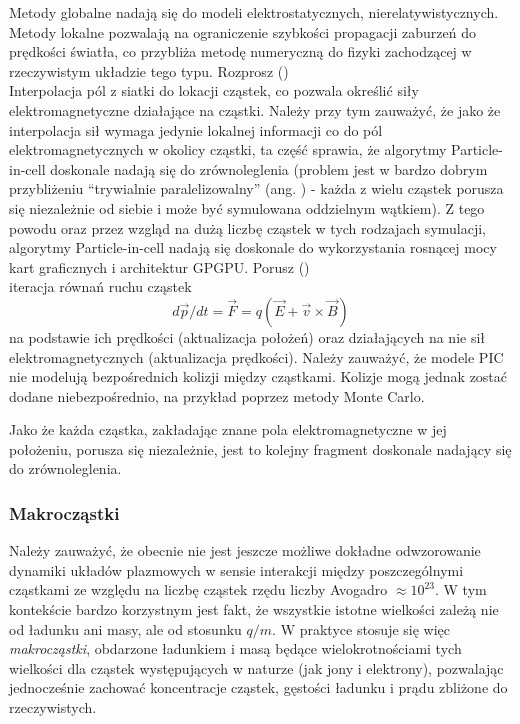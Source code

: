 \begin{itemize}
    Metody globalne nadają się do modeli elektrostatycznych,
    nierelatywistycznych.  Metody lokalne pozwalają na ograniczenie szybkości
    propagacji zaburzeń do prędkości światła, co przybliża metodę numeryczną do
    fizyki zachodzącej w rzeczywistym układzie tego typu.
    \itemi{} Rozprosz () \\
    Interpolacja pól z siatki do lokacji cząstek, co pozwala określić siły
    elektromagnetyczne działające na cząstki.  Należy przy tym zauważyć, że
    jako że interpolacja sił wymaga jedynie lokalnej informacji co do pól
    elektromagnetycznych w okolicy cząstki, ta część sprawia, że
    algorytmy Particle-in-cell doskonale nadają się do zrównoleglenia (problem
    jest w bardzo dobrym przybliżeniu ``trywialnie paralelizowalny'' (ang.
    ) - każda z
    wielu cząstek porusza się niezależnie od siebie i może być symulowana
    oddzielnym wątkiem). Z tego powodu oraz przez wzgląd na dużą liczbę cząstek
    w tych rodzajach symulacji, algorytmy Particle-in-cell nadają się doskonale
    do wykorzystania rosnącej mocy kart graficznych i architektur GPGPU\@.
    \itemi{} Porusz () \\
    iteracja równań ruchu cząstek
    \begin{equation}
        d \vec{p}/dt = \vec{F} = q (\vec{E} + \vec{v} \times \vec{B})
        \label{eq-of-motion}
    \end{equation}
    na podstawie ich prędkości (aktualizacja położeń) oraz działających na nie
    sił elektromagnetycznych (aktualizacja prędkości). Należy zauważyć, że
    modele PIC nie modelują bezpośrednich kolizji między cząstkami. Kolizje
    mogą jednak zostać dodane niebezpośrednio, na przykład poprzez metody Monte
    Carlo.

    Jako że każda cząstka, zakładając znane pola elektromagnetyczne w jej
    położeniu, porusza się niezależnie, jest to kolejny fragment doskonale
    nadający się do zrównoleglenia.
    \end{itemize}
    \subsubsection{Makrocząstki}
    Należy zauważyć, że obecnie nie jest jeszcze możliwe dokładne odwzorowanie
    dynamiki układów plazmowych w sensie interakcji między poszczególnymi
    cząstkami ze względu na liczbę cząstek rzędu liczby Avogadro $\approx
    10^{23}$.  W tym kontekście bardzo korzystnym jest fakt, że wszystkie
    istotne wielkości zależą nie od ładunku ani masy, ale od stosunku $q/m$. W
    praktyce stosuje się więc \emph{makrocząstki}, obdarzone ładunkiem i masą
    będące wielokrotnościami tych wielkości dla cząstek występujących w naturze
    (jak jony i elektrony), pozwalając jednocześnie zachować koncentracje cząstek,
    gęstości ładunku i prądu zbliżone do rzeczywistych.

